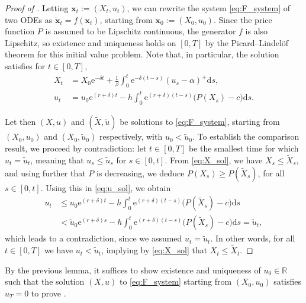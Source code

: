 \documentclass[12pt]{article}
\def \R{\mathbb{R}}
\def\erm{\mathrm{e}}
\def\drm{\mathrm{d}}
\begin{document}
\begin{proof}[Proof of ]
Letting $\bm{x}_t:=(X_t,u_t)$, we can rewrite the system \eqref{eq:F_system} of two ODEs as $\dot{\bm{x}}_t=f(\bm{x}_t)$, starting from $\bm{x}_0:=(X_0,u_0)$.
Since the price function $P$ is assumed to be Lipschitz continuous, the generator $f$ is also Lipschitz, so existence and uniqueness holds on $[0,T]$ by the Picard–Lindelöf theorem for this initial value problem. 
Note that, in particular, the solution satisfies for $t \in [0,T]$,
\begin{subequations}\label{eq:sol_explicit}
\begin{align}
X_t &=X_0 \erm^{-\delta t}+\frac{1}{\beta}\int_{0}^{t} \erm^{-\delta(t-s)} (u_s-\alpha)^+ \drm s, \label{eq:X_sol}\\ 
u_t &=u_0 \erm^{(r+\delta)t}-h\int_{0}^{t} \erm^{(r+\delta)(t-s)} \big( P(X_s)-c\big)  \drm s. \label{eq:u_sol}
\end{align}
\end{subequations} 

Let then $(X,u)$ and $(\tilde X, \tilde{u})$ be solutions to \eqref{eq:F_system}, starting from $(X_0,u_0)$ and $(X_0, \tilde{u}_0)$ respectively, with $u_0<\tilde{u}_0$. To establish the comparison result, we proceed by contradiction: let $t\in[0,T]$ be the smallest time for which $u_t=\tilde{u}_t$, meaning that $u_s \leq \tilde{u}_s$ for $s \in [0,t]$. From \eqref{eq:X_sol}, we have $X_s \leq \tilde X_s$, and using further that $P$ is decreasing, we deduce $P(X_s) \geq P(\tilde X_s)$, for all $s \in [0,t]$. Using this in \eqref{eq:u_sol}, we obtain
\begin{align*}
u_t 
&\leq u_0 \erm^{(r+\delta)t}-h\int_{0}^{t} \erm^{(r+\delta)(t-s)} \big( P(\tilde X_s)-c \big) \drm s\\
&<\tilde{u}_0 \erm^{(r+\delta)s}-h\int_{0}^{t} \erm^{(r+\delta)(t-s)} \big(P(\tilde X_s)-c \big) \drm s
=\tilde{u}_t,
\end{align*}
which leads to a contradiction, since we assumed $u_t=\tilde{u}_t$. In other words, for all $t \in [0,T]$ we have $u_t<\tilde{u}_t$, implying by \eqref{eq:X_sol} that $X_t \leq \tilde X_t$.
\end{proof}

By the previous lemma, it suffices to show existence and uniqueness of $u_0 \in \R$ such that the solution $(X,u)$ to \eqref{eq:F_system} starting from $(X_0,u_0)$ satisfies $u_T = 0$ to prove .
\end{document}
